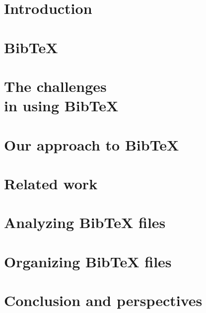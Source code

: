 \documentclass[twoside,11pt,openright,a4paper]{report}
\newcommand{\bibtex}{Bib{\TeX}}
\begin{document}
%

\tableofcontents
\newpage

\setcounter{secnumdepth}{2}


\chapter{Introduction}
\label{ch:intro}


\chapter{{\bibtex}}
\label{ch:about}


\chapter{The challenges\\in using {\bibtex}}
\label{ch:problem-description}


\chapter{Our approach to {\bibtex}}
\label{ch:approach}


\chapter{Related work}
\label{ch:related}


\chapter{Analyzing {\bibtex} files}
\label{ch:analyzing}


\chapter{Organizing {\bibtex} files}
\label{ch:organizing}


\chapter{Conclusion and perspectives}
\label{ch:conclusion}


\printbibliography{}
\end{document}

